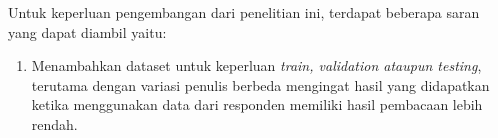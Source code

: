 Untuk keperluan pengembangan dari penelitian ini, terdapat beberapa saran yang dapat diambil yaitu:
\begin{enumerate}[nolistsep]
    \item Menambahkan dataset untuk keperluan \textit{train, validation \textnormal{ataupun} testing}, terutama dengan variasi penulis berbeda mengingat hasil yang didapatkan ketika menggunakan data dari responden memiliki hasil pembacaan lebih rendah.
\end{enumerate}






